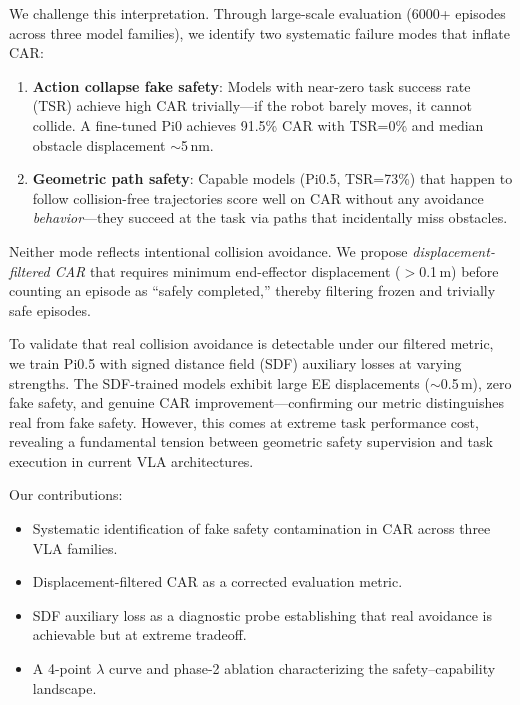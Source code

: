 \documentclass[10pt,twocolumn]{article}
\begin{document}
We challenge this interpretation. Through large-scale evaluation (6000+ episodes across three model families), we identify two systematic failure modes that inflate CAR:

\begin{enumerate}
    \item \textbf{Action collapse fake safety}: Models with near-zero task success rate (TSR) achieve high CAR trivially---if the robot barely moves, it cannot collide. A fine-tuned Pi0 achieves 91.5\% CAR with TSR=0\% and median obstacle displacement $\sim$5\,nm.
    \item \textbf{Geometric path safety}: Capable models (Pi0.5, TSR=73\%) that happen to follow collision-free trajectories score well on CAR without any avoidance \emph{behavior}---they succeed at the task via paths that incidentally miss obstacles.
\end{enumerate}

Neither mode reflects intentional collision avoidance. We propose \emph{displacement-filtered CAR} that requires minimum end-effector displacement ($>$0.1\,m) before counting an episode as ``safely completed,'' thereby filtering frozen and trivially safe episodes.

To validate that real collision avoidance is detectable under our filtered metric, we train Pi0.5 with signed distance field (SDF) auxiliary losses at varying strengths. The SDF-trained models exhibit large EE displacements ($\sim$0.5\,m), zero fake safety, and genuine CAR improvement---confirming our metric distinguishes real from fake safety. However, this comes at extreme task performance cost, revealing a fundamental tension between geometric safety supervision and task execution in current VLA architectures.

Our contributions:
\begin{itemize}
    \item Systematic identification of fake safety contamination in CAR across three VLA families.
    \item Displacement-filtered CAR as a corrected evaluation metric.
    \item SDF auxiliary loss as a diagnostic probe establishing that real avoidance is achievable but at extreme tradeoff.
    \item A 4-point $\lambda$ curve and phase-2 ablation characterizing the safety--capability landscape.
\end{itemize}

\end{document}
